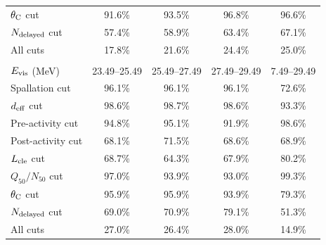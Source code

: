 \begin{table}[h]
\begin{tabular}{lcccc}
		$\theta_{\rm C}$ cut  & 91.6\%       & 93.5\%       & 96.8\%       & 96.6\%       \\
		$N_{\rm delayed}$ cut & 57.4\%       & 58.9\%       & 63.4\%       & 67.1\%       \\ \hline
		All cuts              & 17.8\%       & 21.6\%       & 24.4\%       & 25.0\%       \\ \hline \hline
		                      &              &              &              &              \\ \hline \hline
		$E_{\rm vis}$ (MeV)   & 23.49--25.49 & 25.49--27.49 & 27.49--29.49 & 7.49--29.49  \\ \hline
		Spallation cut        & 96.1\%       & 96.1\%       & 96.1\%       & 72.6\%       \\
		$d_{\rm eff}$ cut     & 98.6\%       & 98.7\%       & 98.6\%       & 93.3\%       \\
		Pre-activity cut      & 94.8\%       & 95.1\%       & 91.9\%       & 98.6\%       \\
		Post-activity cut     & 68.1\%       & 71.5\%       & 68.6\%       & 68.9\%       \\
		$L_{\rm cle}$ cut     & 68.7\%       & 64.3\%       & 67.9\%       & 80.2\%       \\
		$Q_{50}/N_{50}$ cut   & 97.0\%       & 93.9\%       & 93.0\%       & 99.3\%       \\
		$\theta_{\rm C}$ cut  & 95.9\%       & 95.9\%       & 93.9\%       & 79.3\%       \\
		$N_{\rm delayed}$ cut & 69.0\%       & 70.9\%       & 79.1\%       & 51.3\%       \\ \hline
		All cuts              & 27.0\%       & 26.4\%       & 28.0\%       & 14.9\%       \\ \hline \hline
	\end{tabular}
\end{table}






\newpage

